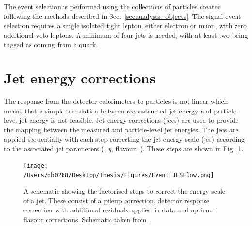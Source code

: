 The event selection is performed using the collections of particles created following the methods described in Sec.~\ref{sec:analysis_objects}.
The signal event selection requires a single isolated tight lepton, either electron or muon, with zero additional veto leptons.
A minimum of four jets is needed, with at least two being tagged as coming from a \bquark{} quark.


\section{Jet energy corrections} %
\label{sub:jet_energy_corrections}

The response from the detector calorimeters to particles is not linear which means that a simple translation between reconstructed jet energy and particle-level jet energy is not feasible.
Jet energy corrections (\acrshort{jec}s) are used to provide the mapping between the measured and particle-level jet energies.
The \acrshort{jec}s are applied sequentially with each step correcting the jet energy scale (\acrshort{jes}) according to the associated jet parameters (\pt{}, $\eta$, flavour, \etc{}).
These steps are shown in Fig.~\ref{fig:JESFlow}.
\begin{figure}[htpb]
	\centering
	\texttt{[image: /Users/db0268/Desktop/Thesis/Figures/Event\_JESFlow.png]}
	\caption[A schematic showing the factorised steps to correct the energy scale of a jet. These consist of a pileup correction, detector response correction with additional residuals applied in data and optional flavour corrections.]{A schematic showing the factorised steps to correct the energy scale of a jet. These consist of a pileup correction, detector response correction with additional residuals applied in data and optional flavour corrections. Schematic taken from~\cite{Event:JEC}.}
	\label{fig:JESFlow}
\end{figure}


